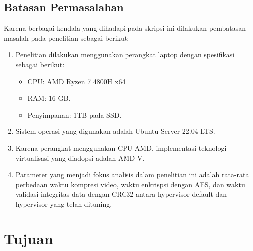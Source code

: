 \subsection{Batasan Permasalahan}
Karena berbagai kendala yang dihadapi pada skripsi ini dilakukan pembatasan masalah pada penelitian  sebagai berikut:
\begin{enumerate}
  \item Penelitian dilakukan menggunakan perangkat laptop dengan spesifikasi sebagai berikut:
  \begin{itemize}
    \item CPU: AMD Ryzen 7 4800H x64.
	\item RAM: 16 GB.
	\item Penyimpanan: 1TB pada SSD.
 \end{itemize}
  \item Sistem operasi yang digunakan adalah Ubuntu Server 22.04 LTS.
  \item Karena perangkat menggunakan CPU AMD, implementasi teknologi virtualisasi yang diadopsi adalah AMD-V.
  \item Parameter yang menjadi fokus analisis dalam penelitian ini adalah rata-rata perbedaan waktu kompresi video, waktu enkrispsi dengan AES, dan waktu validasi integritas data dengan CRC32 antara hypervisor default dan hypervisor yang telah dituning.
\end{enumerate}


\section{Tujuan}

